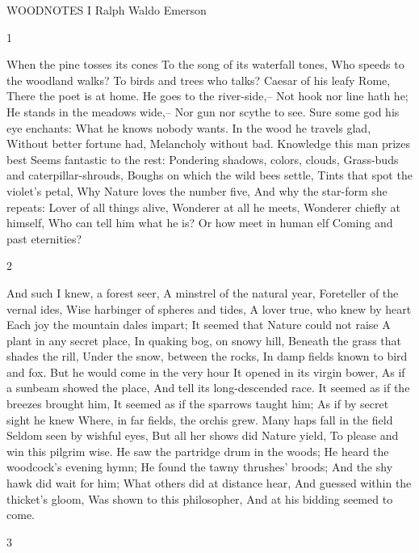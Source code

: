WOODNOTES I
Ralph Waldo Emerson

1

When the pine tosses its cones
To the song of its waterfall tones,
Who speeds to the woodland walks?
To birds and trees who talks?
Caesar of his leafy Rome,
There the poet is at home.
He goes to the river-side,--
Not hook nor line hath he;
He stands in the meadows wide,--
Nor gun nor scythe to see.
Sure some god his eye enchants:
What he knows nobody wants.
In the wood he travels glad,
Without better fortune had,
Melancholy without bad.
Knowledge this man prizes best
Seems fantastic to the rest:
Pondering shadows, colors, clouds,
Grass-buds and caterpillar-shrouds,
Boughs on which the wild bees settle,
Tints that spot the violet's petal,
Why Nature loves the number five,
And why the star-form she repeats:
Lover of all things alive,
Wonderer at all he meets,
Wonderer chiefly at himself,
Who can tell him what he is?
Or how meet in human elf
Coming and past eternities?

2

And such I knew, a forest seer,
A minstrel of the natural year,
Foreteller of the vernal ides,
Wise harbinger of spheres and tides,
A lover true, who knew by heart
Each joy the mountain dales impart;
It seemed that Nature could not raise
A plant in any secret place,
In quaking bog, on snowy hill,
Beneath the grass that shades the rill,
Under the snow, between the rocks,
In damp fields known to bird and fox.
But he would come in the very hour
It opened in its virgin bower,
As if a sunbeam showed the place,
And tell its long-descended race.
It seemed as if the breezes brought him,
It seemed as if the sparrows taught him;
As if by secret sight he knew
Where, in far fields, the orchis grew.
Many haps fall in the field
Seldom seen by wishful eyes,
But all her shows did Nature yield,
To please and win this pilgrim wise.
He saw the partridge drum in the woods;
He heard the woodcock's evening hymn;
He found the tawny thrushes' broods;
And the shy hawk did wait for him;
What others did at distance hear,
And guessed within the thicket's gloom,
Was shown to this philosopher,
And at his bidding seemed to come.

3

